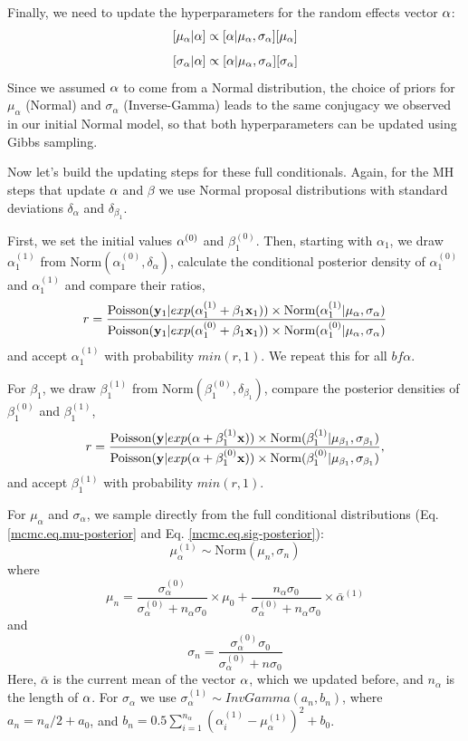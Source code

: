Finally, we need to update the hyperparameters for the random effects
vector ${\bf \alpha}$:
\[
[\mu_{\alpha}|{\bf \alpha}] \propto [{\bf \alpha}|\mu_{\alpha}, \sigma_{\alpha}] [\mu_{\alpha}]
\]
\[
[\sigma_{\alpha}|{\bf\alpha}] \propto [\alpha|\mu_{\alpha}, \sigma_{\alpha}] [\sigma_{\alpha}]
\]
Since we assumed ${\bf \alpha}$ to come from a Normal distribution,
the choice of priors for $\mu_{\alpha}$ (Normal) and $\sigma_{\alpha}$
(Inverse-Gamma) leads to the same conjugacy we observed in our initial
Normal model, so that both hyperparameters can be updated using Gibbs
sampling.

Now let's build the updating steps for these full conditionals. Again,
for the MH steps that update ${\bf \alpha}$ and $\beta$ we use Normal
proposal distributions with standard deviations $\delta_{\alpha}$ and
$\delta_{\beta_1}$.

First, we set the initial values ${\bf \alpha}^{(0)}$ and
$\beta_1^{(0)}$. Then, starting with $\alpha_1$, we draw
$\alpha_1^{(1)}$ from $\mbox{Norm}(\alpha_1^{(0)}, \delta_{\alpha})$,
calculate the conditional posterior density of $\alpha_1^{(0)}$ and
$\alpha_1^{(1)}$ and compare their ratios,
\[
r = \frac{\mbox{Poisson}({\bf y}_{1}|exp(\alpha_1^{(1)} + \beta_1 {\bf x}_1)) \times
  \mbox{Norm}(\alpha_1^{(1)}|\mu_{\alpha}, \sigma_{\alpha})} {\mbox{Poisson}({\bf y}_{1}|exp(\alpha_1^{(0)} + \beta_1 {\bf x}_1)) \times \mbox{Norm}(\alpha_1^{(0)}|\mu_{\alpha}, \sigma_{\alpha})}
\]
and accept $\alpha_1^{(1)}$ with probability $min(r,1)$. We repeat this for all ${bf \alpha}$.

For $\beta_1$, we draw $\beta_1^{(1)}$ from $\mbox{Norm} (\beta_1^{(0)}, \delta_{\beta_1})$, compare the posterior densities of $\beta_1^{(0)}$ and $\beta_1^{(1)}$,
\[
r = \frac{\mbox{Poisson}({\bf y}|exp({\bf \alpha} + \beta_1^{(1)}{\bf x}))
  \times\mbox{Norm}(\beta_1^{(1)}|\mu_{\beta_1}, \sigma_{\beta_1})} { \mbox{Poisson}({\bf
    y}|exp({\bf \alpha} + \beta_1^{(0)}{\bf x})) \times \mbox{Norm}(\beta_1^{(0)}|\mu_{\beta_1}, \sigma_{\beta_1})},
\]
and accept $\beta_1^{(1)}$  with probability $min(r,1)$.

For $\mu_{\alpha}$ and $\sigma_{\alpha}$, we sample directly from the full conditional distributions (Eq. \ref{mcmc.eq.mu-posterior}  and Eq. \ref{mcmc.eq.sig-posterior}):
\[
\mu_{\alpha}^{(1)} \sim \mbox{Norm} (\mu_n, \sigma_n)
\]
where 
\[\mu_n =  \frac{\sigma_{\alpha}^{(0)}}  {\sigma_{\alpha}^{(0)}   +n_{\alpha}    \sigma_0} \times  \mu_0 +  \frac{n_{\alpha}  \sigma_0} {\sigma_{\alpha}^{(0)}   +n_{\alpha} \sigma_0} \times \bar{\alpha}^{(1)}
\]
and 
\[
\sigma_n= \frac{\sigma_{\alpha}^{(0)}   \sigma_0 } {\sigma_{\alpha}^{(0)}  + n \sigma_0}
\]
Here, $\bar{\alpha}$ is the current mean of the vector ${\bf\alpha}$, which we
updated before, and $n_{\alpha}$ is the length of ${\bf\alpha}$. 
For $\sigma_{\alpha}$ we use $\sigma_{\alpha}^{(1)}\sim InvGamma (a_n, b_n)$,
where  $a_n = n_a/2   + a_0$, and $b_n = 0.5  \displaystyle\sum\limits_{i=1}^{n_{\alpha}} (\alpha_i^{(1)}-\mu_{\alpha}^{(1)})^2+ b_0$.


